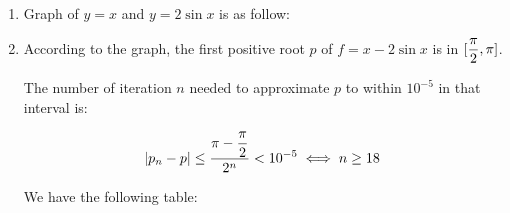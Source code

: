 \documentclass[../../Assignments.tex]{subfiles}
\begin{document}
\begin{solution}
    \begin{enumerate}[label = (\alph*)]
        \item Graph of \(y = x\) and \(y = 2 \sin{x}\) is as follow:

            \begin{center}
                
            \end{center}

        \item According to the graph, the first positive root \(p\) of \(f = x -
            2 \sin{x}\) is in \(\interval{\dfrac{\pi}{2}}{\pi}\).

            The number of iteration \(n\) needed to approximate \(p\) to within
            \(10^{-5}\) in that interval is:

            \[\abs{p_n - p} \leq \frac{\pi - \dfrac{\pi}{2}}{2^n} < 10^{-5} \iff n \geq 18\]

            We have the following table:


\end{enumerate}
\end{solution}
\end{document}
